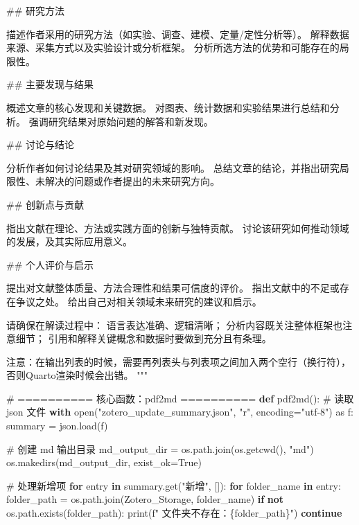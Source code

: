 \documentclass[
  letterpaper,
  DIV=11,
  numbers=noendperiod]{scrreprt}
\newenvironment{Shaded}{\begin{snugshade}}{\end{snugshade}}
\newcommand{\BuiltInTok}[1]{\textcolor[rgb]{0.00,0.23,0.31}{#1}}
\newcommand{\CommentTok}[1]{\textcolor[rgb]{0.37,0.37,0.37}{#1}}
\newcommand{\ControlFlowTok}[1]{\textcolor[rgb]{0.00,0.23,0.31}{\textbf{#1}}}
\newcommand{\ImportTok}[1]{\textcolor[rgb]{0.00,0.46,0.62}{#1}}
\newcommand{\KeywordTok}[1]{\textcolor[rgb]{0.00,0.23,0.31}{\textbf{#1}}}
\newcommand{\NormalTok}[1]{\textcolor[rgb]{0.00,0.23,0.31}{#1}}
\newcommand{\OperatorTok}[1]{\textcolor[rgb]{0.37,0.37,0.37}{#1}}
\newcommand{\SpecialCharTok}[1]{\textcolor[rgb]{0.37,0.37,0.37}{#1}}
\newcommand{\SpecialStringTok}[1]{\textcolor[rgb]{0.13,0.47,0.30}{#1}}
\newcommand{\StringTok}[1]{\textcolor[rgb]{0.13,0.47,0.30}{#1}}
\newcommand{\VariableTok}[1]{\textcolor[rgb]{0.07,0.07,0.07}{#1}}
\begin{document}
\begin{Shaded}
\begin{Highlighting}[]
\StringTok{\#\# 研究方法}

\StringTok{描述作者采用的研究方法（如实验、调查、建模、定量/定性分析等）。}
\StringTok{解释数据来源、采集方式以及实验设计或分析框架。}
\StringTok{分析所选方法的优势和可能存在的局限性。}

\StringTok{\#\# 主要发现与结果}

\StringTok{概述文章的核心发现和关键数据。}
\StringTok{对图表、统计数据和实验结果进行总结和分析。}
\StringTok{强调研究结果对原始问题的解答和新发现。}

\StringTok{\#\# 讨论与结论}

\StringTok{分析作者如何讨论结果及其对研究领域的影响。}
\StringTok{总结文章的结论，并指出研究局限性、未解决的问题或作者提出的未来研究方向。}

\StringTok{\#\# 创新点与贡献}

\StringTok{指出文献在理论、方法或实践方面的创新与独特贡献。}
\StringTok{讨论该研究如何推动领域的发展，及其实际应用意义。}

\StringTok{\#\# 个人评价与启示}

\StringTok{提出对文献整体质量、方法合理性和结果可信度的评价。}
\StringTok{指出文献中的不足或存在争议之处。}
\StringTok{给出自己对相关领域未来研究的建议和启示。}

\StringTok{请确保在解读过程中：}
\StringTok{语言表达准确、逻辑清晰；}
\StringTok{分析内容既关注整体框架也注意细节；}
\StringTok{引用和解释关键概念和数据时要做到充分且有条理。}

\StringTok{注意：在输出列表的时候，需要再列表头与列表项之间加入两个空行（换行符），否则Quarto渲染时候会出错。}
\StringTok{"""}

\CommentTok{\# ========== 核心函数：pdf2md ==========}
\KeywordTok{def}\NormalTok{ pdf2md():}
    \CommentTok{\# 读取 json 文件}
    \ControlFlowTok{with} \BuiltInTok{open}\NormalTok{(}\StringTok{"zotero\_update\_summary.json"}\NormalTok{, }\StringTok{"r"}\NormalTok{, encoding}\OperatorTok{=}\StringTok{"utf{-}8"}\NormalTok{) }\ImportTok{as}\NormalTok{ f:}
\NormalTok{        summary }\OperatorTok{=}\NormalTok{ json.load(f)}

    \CommentTok{\# 创建 md 输出目录}
\NormalTok{    md\_output\_dir }\OperatorTok{=}\NormalTok{ os.path.join(os.getcwd(), }\StringTok{"md"}\NormalTok{)}
\NormalTok{    os.makedirs(md\_output\_dir, exist\_ok}\OperatorTok{=}\VariableTok{True}\NormalTok{)}

    \CommentTok{\# 处理新增项}
    \ControlFlowTok{for}\NormalTok{ entry }\KeywordTok{in}\NormalTok{ summary.get(}\StringTok{"新增"}\NormalTok{, []):}
        \ControlFlowTok{for}\NormalTok{ folder\_name }\KeywordTok{in}\NormalTok{ entry:}
\NormalTok{            folder\_path }\OperatorTok{=}\NormalTok{ os.path.join(Zotero\_Storage, folder\_name)}
            \ControlFlowTok{if} \KeywordTok{not}\NormalTok{ os.path.exists(folder\_path):}
                \BuiltInTok{print}\NormalTok{(}\SpecialStringTok{f" 文件夹不存在：}\SpecialCharTok{\{}\NormalTok{folder\_path}\SpecialCharTok{\}}\SpecialStringTok{"}\NormalTok{)}
                \ControlFlowTok{continue}


\end{Highlighting}
\end{Shaded}
\end{document}
